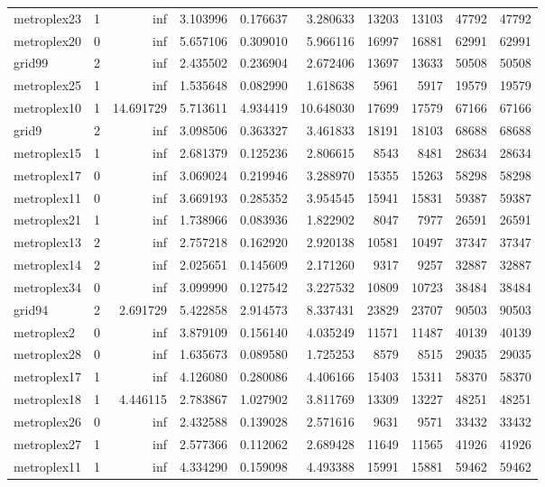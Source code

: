 \begin{longtable}{|l|r|r|r|r|r|r|r|r|r|}
metroplex23 & 1 & inf & 3.103996 & 0.176637 & 3.280633 & 13203 & 13103 & 47792 & 47792 \\
metroplex20 & 0 & inf & 5.657106 & 0.309010 & 5.966116 & 16997 & 16881 & 62991 & 62991 \\
grid99 & 2 & inf & 2.435502 & 0.236904 & 2.672406 & 13697 & 13633 & 50508 & 50508 \\
metroplex25 & 1 & inf & 1.535648 & 0.082990 & 1.618638 & 5961 & 5917 & 19579 & 19579 \\
metroplex10 & 1 & 14.691729 & 5.713611 & 4.934419 & 10.648030 & 17699 & 17579 & 67166 & 67166 \\
grid9 & 2 & inf & 3.098506 & 0.363327 & 3.461833 & 18191 & 18103 & 68688 & 68688 \\
metroplex15 & 1 & inf & 2.681379 & 0.125236 & 2.806615 & 8543 & 8481 & 28634 & 28634 \\
metroplex17 & 0 & inf & 3.069024 & 0.219946 & 3.288970 & 15355 & 15263 & 58298 & 58298 \\
metroplex11 & 0 & inf & 3.669193 & 0.285352 & 3.954545 & 15941 & 15831 & 59387 & 59387 \\
metroplex21 & 1 & inf & 1.738966 & 0.083936 & 1.822902 & 8047 & 7977 & 26591 & 26591 \\
metroplex13 & 2 & inf & 2.757218 & 0.162920 & 2.920138 & 10581 & 10497 & 37347 & 37347 \\
metroplex14 & 2 & inf & 2.025651 & 0.145609 & 2.171260 & 9317 & 9257 & 32887 & 32887 \\
metroplex34 & 0 & inf & 3.099990 & 0.127542 & 3.227532 & 10809 & 10723 & 38484 & 38484 \\
grid94 & 2 & 2.691729 & 5.422858 & 2.914573 & 8.337431 & 23829 & 23707 & 90503 & 90503 \\
metroplex2 & 0 & inf & 3.879109 & 0.156140 & 4.035249 & 11571 & 11487 & 40139 & 40139 \\
metroplex28 & 0 & inf & 1.635673 & 0.089580 & 1.725253 & 8579 & 8515 & 29035 & 29035 \\
metroplex17 & 1 & inf & 4.126080 & 0.280086 & 4.406166 & 15403 & 15311 & 58370 & 58370 \\
metroplex18 & 1 & 4.446115 & 2.783867 & 1.027902 & 3.811769 & 13309 & 13227 & 48251 & 48251 \\
metroplex26 & 0 & inf & 2.432588 & 0.139028 & 2.571616 & 9631 & 9571 & 33432 & 33432 \\
metroplex27 & 1 & inf & 2.577366 & 0.112062 & 2.689428 & 11649 & 11565 & 41926 & 41926 \\
metroplex11 & 1 & inf & 4.334290 & 0.159098 & 4.493388 & 15991 & 15881 & 59462 & 59462 \\

\end{longtable}
